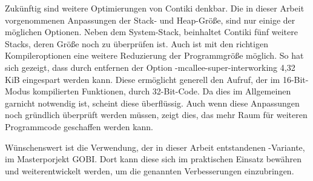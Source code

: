 Zukünftig sind weitere Optimierungen von Contiki denkbar. Die in dieser Arbeit vorgenommenen Anpassungen der Stack- und Heap-Größe,
sind nur einige der möglichen Optionen. Neben dem System-Stack, beinhaltet Contiki fünf weitere Stacks, deren Größe noch zu überprüfen ist.
Auch ist mit den richtigen Kompileroptionen eine weitere Reduzierung der Programmgröße möglich. So hat sich gezeigt, dass durch
entfernen der Option -mcallee-super-interworking 4,32 KiB eingespart werden kann. Diese ermöglicht generell den Aufruf, der im 16-Bit-Modus
kompilierten Funktionen, durch 32-Bit-Code. Da dies im Allgemeinen garnicht notwendig ist, scheint diese überflüssig.
Auch wenn diese Anpassungen noch gründlich überprüft werden müssen, zeigt dies, das mehr Raum für weiteren Programmcode geschaffen werden kann.

Wünschenswert ist die Verwendung, der in dieser Arbeit entstandenen -Variante, im Masterporjekt GOBI.
Dort kann diese sich im praktischen Einsatz bewähren und weiterentwickelt werden, um die genannten Verbesserungen
einzubringen.
